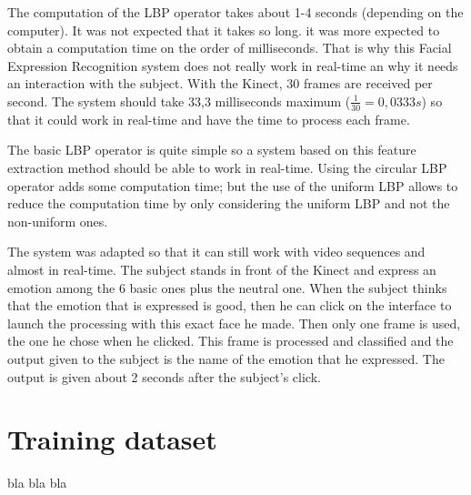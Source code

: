 \vspace{\baselineskip}
\noindent The computation of the LBP operator takes about 1-4 seconds (depending on the computer). It was not expected that it takes so long. it was more expected to obtain a computation time on the order of milliseconds. That is why this Facial Expression Recognition system does not really work in real-time an why it needs an interaction with the subject. With the Kinect, 30 frames are received per second. The system should take 33,3 milliseconds maximum ($ \frac{1}{30} = 0,0333 s $) so that it could work in real-time and have the time to process each frame. 
\newline

\noindent The basic LBP operator is quite simple so a system based on this feature extraction method should be able to work in real-time. Using the circular LBP operator adds some computation time; but the use of the uniform LBP allows to reduce the computation time by only considering the uniform LBP and not the non-uniform ones.
\newline

\noindent The system was adapted so that it can still work with video sequences and almost in real-time. The subject stands in front of the Kinect and express an emotion among the 6 basic ones plus the neutral one. When the subject thinks that the emotion that is expressed is good, then he can click on the interface to launch the processing with this exact face he made. Then only one frame is used, the one he chose when he clicked. This frame is processed and classified and the output given to the subject is the name of the emotion that he expressed. The output is given about 2 seconds after the subject's click.
\newline

\section{Training dataset}

\vspace{\baselineskip}

\noindent bla bla bla
\newline